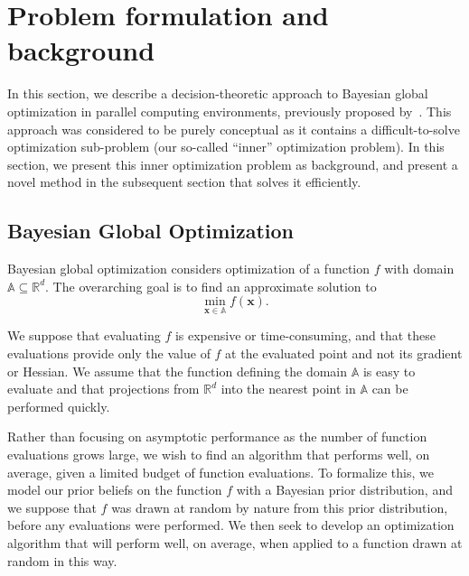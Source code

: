 \documentclass[paper=letter]{scrartcl}
\begin{document}
\section{Problem formulation and background} 
\label{sec:problem}
In this section, we describe a decision-theoretic approach to Bayesian global
optimization in parallel computing environments, previously proposed by~\cite{GiLeCa08}.  
This approach was considered to be purely conceptual 
as it contains a difficult-to-solve optimization sub-problem (our so-called ``inner'' optimization problem).
In this section, we present this inner optimization problem as background, and present a novel method in the subsequent section that solves it efficiently.

\subsection{Bayesian Global Optimization}
Bayesian global optimization considers optimization of a function $f$ with domain 
$\mathbb{A} \subseteq \mathbb{R}^{d}$.  The overarching goal is to find an approximate solution to 
\begin{equation*}
\min_{\bm{x} \in \mathbb{A}} f(\bm{x}).
\end{equation*}

We suppose that evaluating $f$ is expensive or time-consuming, and that these evaluations 
provide only the value of $f$ at the evaluated point and not its gradient or Hessian. 
We assume that the function defining the domain $\mathbb{A}$ is easy to evaluate and that 
projections from $\mathbb{R}^d$ into the nearest point in $\mathbb{A}$ can be performed quickly.

Rather than focusing on asymptotic performance as the number of function evaluations grows large, 
we wish to find an algorithm that performs well, on average, given a limited budget of function 
evaluations.  To formalize this, we model our prior beliefs on the function $f$ with a Bayesian 
prior distribution, and we suppose that $f$ was drawn at random by nature from this prior 
distribution, before any evaluations were performed.  We then seek to develop an optimization 
algorithm that will perform well, on average, when applied to a function drawn at random in this way.
\end{document}
